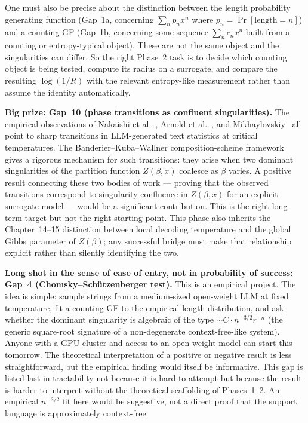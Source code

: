 One must also be precise about the distinction between the length
probability generating function (Gap~1a, concerning $\sum_n p_n x^n$
where $p_n = \Pr[\text{length} = n]$) and a counting GF (Gap~1b,
concerning some sequence $\sum_n c_n x^n$ built from a counting or
entropy-typical object).  These are not the same object and the
singularities can differ.  So the right Phase~2 task is to decide
which counting object is being tested, compute its radius on a
surrogate, and compare the resulting $\log(1/R)$ with the relevant
entropy-like measurement rather than assume the identity automatically.

\textbf{Big prize: Gap~10 (phase transitions as confluent
singularities).}  The empirical observations of Nakaishi et
al.~\cite{NakaishiNishikawaHukushima2024}, Arnold et
al.~\cite{ArnoldEtAl2024}, and
Mikhaylovskiy~\cite{Mikhaylovskiy2025} all point to sharp transitions
in LLM-generated text statistics at critical temperatures.  The
Banderier--Kuba--Wallner composition-scheme framework~\cite{BanderierKubaWallner2021}
gives a rigorous mechanism for such transitions: they arise when two
dominant singularities of the partition function $Z(\beta, x)$ coalesce
as $\beta$ varies.  A positive result connecting these two bodies of
work --- proving that the observed transitions correspond to singularity
confluence in $Z(\beta, x)$ for an explicit surrogate model --- would
be a significant contribution.  This is the right long-term target
but not the right starting point.
This phase also inherits the Chapter~14--15 distinction between local
decoding temperature and the global Gibbs parameter of $Z(\beta)$; any
successful bridge must make that relationship explicit rather than
silently identifying the two.

\textbf{Long shot in the sense of ease of entry, not in probability of
success: Gap~4 (Chomsky--Schützenberger test).}  This is an
empirical project.  The idea is simple: sample strings from a
medium-sized open-weight LLM at fixed temperature, fit a counting GF to
the empirical length distribution, and ask whether the dominant
singularity is algebraic of the type $\sim C \cdot n^{-3/2} r^{-n}$
(the generic square-root signature of a non-degenerate context-free-like
system).  Anyone with
a GPU cluster and access to an open-weight model can start this
tomorrow.  The theoretical interpretation of a positive or negative
result is less straightforward, but the empirical finding would itself
be informative.  This gap is listed last in tractability not because it
is hard to attempt but because the result is harder to interpret without
the theoretical scaffolding of Phases~1--2.
An empirical $n^{-3/2}$ fit here would be suggestive, not a direct proof
that the support language is approximately context-free.


